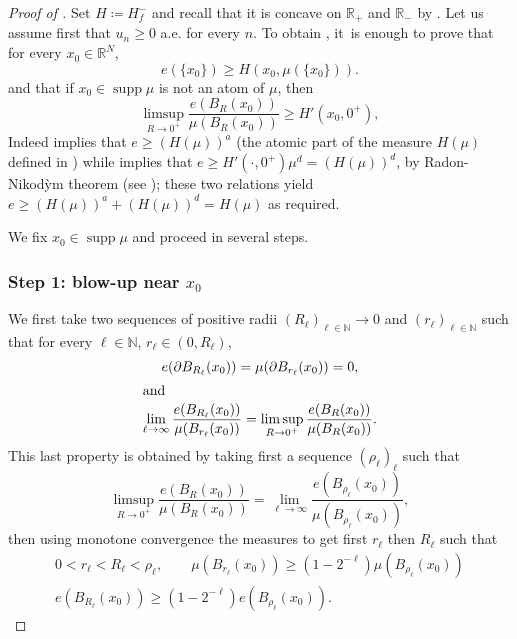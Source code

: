 \documentclass[JEP,XML,SOM,Unicode,published]{cedram}
\theoremstyle{plain}
\theoremstyle{definition}
\newcommand{\N}{\mathbb{N}}
\newcommand{\R}{\mathbb{R}}
\DeclareMathOperator{\supp}{supp}
\begin{document}
\begin{proof}[Proof of ]
Set $H \coloneqq H_f^-$ and recall that it is concave on $\R_+$ and $\R_-$ by . Let us assume first that $u_n \geq 0$ a.e. for every $n$. To obtain , it~is enough to prove that for every \(x_0\in\R^N\),
\begin{equation}\label{atomic}
e(\{x_0\})\ge H(x_0,\mu(\{x_0\})).
\end{equation}
and that if \(x_0 \in \supp \mu\) is not an atom of $\mu$, then
\begin{equation}\label{diffuse}
\limsup_{R\to 0^+}\frac{e(B_R(x_0))}{\mu(B_R(x_0))}\ge H'(x_0,0^+),
\end{equation}
Indeed  implies that $e \geq (H(\mu))^a$ (the atomic part of the measure \(H(\mu)\) defined in ) while  implies that $e \geq H'(\cdot,0^+) \mu^d = (H(\mu))^d$, by Radon-Nikod\`ym theorem (see \cite[Th.\,2.22]{ambrosioFunctionsBoundedVariation2000}); these two relations yield \(e\geq (H(\mu))^a+(H(\mu))^d=H(\mu)\) as required.

We fix $x_0 \in \supp \mu$ and proceed in several steps.

\subsubsection*{Step 1: blow-up near \(x_0\)} We first take two sequences of positive radii \((R_\ell)_{\ell\in\N}\to 0\) and \((r_\ell)_{\ell\in\N}\) such that for every \(\ell\in\N\), \(r_\ell\in (0,R_\ell)\),
\begin{gather}
e(\partial B_{R_\ell}(x_0))=\mu(\partial B_{r_\ell}(x_0))=0,\label{seqBoundary}\\
\shortintertext{and}
\lim_{\ell\to\infty}\frac{e(B_{R_\ell}(x_0))}{\mu(B_{r_\ell}(x_0))}
=\limsup_{R\to 0^+}\frac{e(B_R(x_0))}{\mu(B_R(x_0))}.\label{seqUpperDensity}
\end{gather}
This last property is obtained by taking first a sequence $(\rho_\ell)_\ell$ such that
\[
\limsup_{R\to 0^+}\frac{e(B_R(x_0))}{\mu(B_R(x_0))} = \lim_{\ell\to\infty} \frac{e(B_{\rho_\ell}(x_0))}{\mu(B_{\rho_\ell}(x_0))},
\]
then using monotone convergence the measures to get first \(r_\ell\) then \(R_\ell\) such that
\begin{gather*}
0 < r_\ell < R_\ell < \rho_\ell, \qquad \mu(B_{r_\ell}(x_0))\geq (1-2^{-\ell})\mu(B_{\rho_\ell}(x_0))\\
\tag*{and} e(B_{R_\ell}(x_0))\geq (1-2^{-\ell})e(B_{\rho_\ell}(x_0)).
\end{gather*}


\end{proof}
\end{document}
